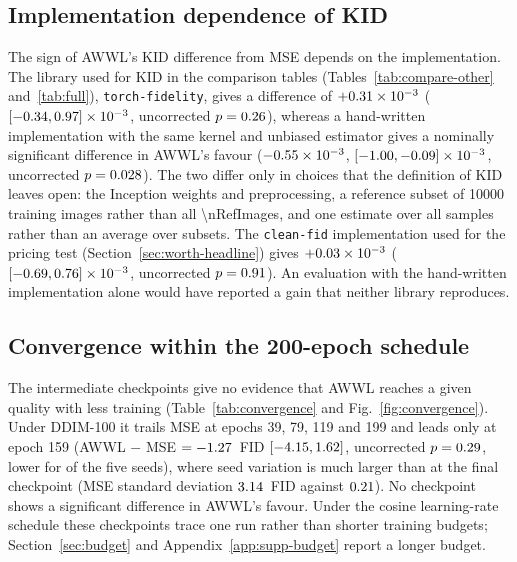 \subsection{Implementation dependence of KID}
\label{app:supp-kid}

The sign of AWWL's KID difference from MSE depends on the implementation.
The library used for KID in the comparison tables
(Tables~\ref{tab:compare-other} and~\ref{tab:full}), \texttt{torch-fidelity},
gives a difference of
$+0.31 \times 10^{-3}$ ($[-0.34, 0.97] \times 10^{-3}$,
uncorrected $p = 0.26$), whereas a
hand-written implementation with the same kernel and unbiased estimator gives
a nominally significant difference in AWWL's favour
($-0.55 \times 10^{-3}$,
$[-1.00, -0.09] \times 10^{-3}$, uncorrected
$p = 0.028$). The two differ only in choices that the definition of
KID leaves open: the Inception weights and preprocessing, a reference subset
of \num{10000} training images rather than all \num{\nRefImages}, and one
estimate over all samples rather than an average over subsets. The
\texttt{clean-fid} implementation used for the pricing test
(Section~\ref{sec:worth-headline}) gives $+0.03 \times 10^{-3}$
($[-0.69, 0.76] \times 10^{-3}$, uncorrected
$p = 0.91$). An evaluation with the hand-written implementation alone
would have reported a gain that neither library reproduces.

\FloatBarrier
\subsection{Convergence within the 200-epoch schedule}
\label{app:supp-convergence}

The intermediate checkpoints give no evidence that AWWL reaches a given
quality with less training (Table~\ref{tab:convergence} and
Fig.~\ref{fig:convergence}). Under DDIM-100 it trails MSE at epochs 39, 79,
119 and 199 and leads only at epoch 159 (AWWL $-$ MSE $= -1.27$~FID
$[-4.15, 1.62]$, uncorrected
$p = 0.29$, lower for \convAheadOneFiftyNine{} of the five
seeds), where seed variation is much larger than at the final checkpoint (MSE
standard deviation $3.14$~FID against
$0.21$). No checkpoint shows a significant difference in
AWWL's favour. Under the cosine learning-rate schedule these checkpoints
trace one run rather than shorter training budgets;
Section~\ref{sec:budget} and Appendix~\ref{app:supp-budget} report a longer
budget.

